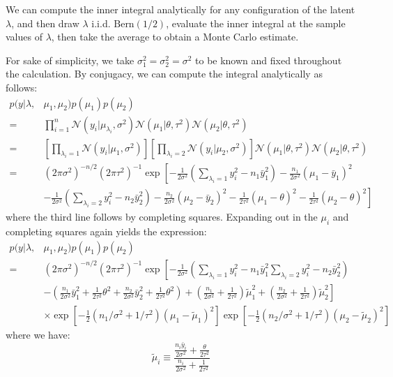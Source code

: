 \documentclass[psamsfonts]{amsart}
\newcommand{\N}{\mathcal{N}}
\begin{document}
We can compute the inner integral analytically for any configuration of the latent $\lambda$, and then draw $\lambda$ i.i.d. $\text{Bern}(1/2)$, evaluate the inner integral at the sample values of $\lambda$, then take the average to obtain a Monte Carlo estimate.

For sake of simplicity, we take $\sigma_1^2 = \sigma_2^2 = \sigma^2$ to be known and fixed throughout the calculation. By conjugacy, we can compute the integral analytically as follows:
\begin{align*}
p(y|\lambda, &\mu_1,\mu_2)p(\mu_1)p(\mu_2)  \\
=& \prod_{i=1}^n \N(y_i|\mu_{\lambda_i}, \sigma^2) \N(\mu_1|\theta, \tau^2)\N(\mu_2|\theta, \tau^2)\\
=& \left[ \prod_{\lambda_i = 1} \N(y_i|\mu_1, \sigma^2)\right] \left[ \prod_{\lambda_i = 2} \N(y_i|\mu_2, \sigma^2) \right] \N(\mu_1|\theta,\tau^2)\N(\mu_2|\theta,\tau^2)\\
=& (2\pi\sigma^2)^{-n/2} (2\pi\tau^2)^{-1} \exp\left[ -\frac{1}{2\sigma^2}\left( \sum_{\lambda_i = 1} y_i^2 - n_1\bar{y}_1^2\right) - \frac{n_1}{2\sigma^2} (\mu_1-\bar{y}_1)^2\right.\\
&- \left.\frac{1}{2\sigma^2}\left(\sum_{\lambda_i = 2}y_i^2 - n_2\bar{y}_2^2\right) - \frac{n_2}{2\sigma^2}(\mu_2-\bar{y}_2)^2 - \frac{1}{2\tau^2}(\mu_1-\theta)^2 - \frac{1}{2\tau^2}(\mu_2 -\theta)^2\right]
\end{align*}
where the third line follows by completing squares. Expanding out in the $\mu_i$ and completing squares again yields the expression:
\begin{align*}
p(y|\lambda, &\mu_1,\mu_2)p(\mu_1)p(\mu_2) \\
=& (2\pi\sigma^2)^{-n/2} (2\pi\tau^2)^{-1} \exp\left[ -\frac{1}{2\sigma^2}\left( \sum_{\lambda_i = 1} y_i^2 - n_1\bar{y}_1^2 \sum_{\lambda_i = 2}y_i^2 - n_2\bar{y}_2^2 \right)\right.\\ 
&- \left.\left( \frac{n_1}{2\sigma^2} \bar{y}_1^2 + \frac{1}{2\tau^2}\theta^2 + \frac{n_2}{2\sigma^2} \bar{y}_2^2 + \frac{1}{2\tau^2} \theta^2\right) + \left(\frac{n_1}{2\sigma^2} + \frac{1}{2\tau^2} \right) \tilde{\mu}_1^2 + \left(\frac{n_2}{2\sigma^2} + \frac{1}{2\tau^2}\right)\tilde{\mu}_2^2 \right]\\
& \times \exp\left[-\frac{1}{2}(n_1/\sigma^2 + 1/\tau^2) (\mu_1-\tilde{\mu}_1)^2\right] \exp\left[-\frac{1}{2}(n_2/\sigma^2 + 1/\tau^2) (\mu_2 - \tilde{\mu}_2)^2\right] 
\end{align*}
where we have:
$$\tilde{\mu}_i \equiv \frac{\frac{n_i\bar{y}_i}{2\sigma^2} + \frac{\theta}{2\tau^2}}{\frac{n_i}{2\sigma^2} + \frac{1}{2\tau^2}}$$
\end{document}
